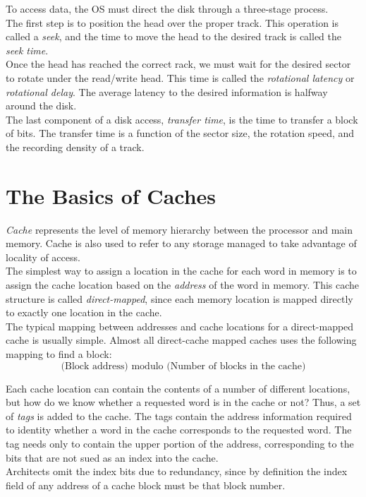 \documentclass[12pt]{article}
\theoremstyle{definition}
\begin{document}
  To access data, the OS must direct the disk through a three-stage process. \\

  The first step is to position the head over the proper track.
  This operation is called a \emph{seek}, and the time to move the head to the desired track is called the \emph{seek time}. \\

  Once the head has reached the correct rack, we must wait for the desired sector to rotate under the read/write head. This time is called the \emph{rotational latency} or \emph{rotational delay}.
  The average latency to the desired information is halfway around the disk. \\

  The last component of a disk access, \emph{transfer time}, is the time to transfer a block of bits.
  The transfer time is a function of the sector size, the rotation speed, and the recording density of a track.

  \section{The Basics of Caches}
  \emph{Cache} represents the level of memory hierarchy between the processor and main memory.
  Cache is also used to refer to any storage managed to take advantage of locality of access. \\

  The simplest way to assign a location in the cache for each word in memory is to assign the cache location based on the \emph{address} of the word in memory.
  This cache structure is called \emph{direct-mapped}, since each memory location is mapped directly to exactly one location in the cache. \\
  The typical mapping between addresses and cache locations for a direct-mapped cache is usually simple.
  Almost all direct-cache mapped caches uses the following mapping to find a block:
  $$\text{(Block address) modulo (Number of blocks in the cache)}$$

  Each cache location can contain the contents of a number of different locations, but how do we know whether a requested word is in the cache or not?
  Thus, a set of \emph{tags} is added to the cache.
  The tags contain the address information required to identity whether a word in the cache corresponds to the requested word.
  The tag needs only to contain the upper portion of the address, corresponding to the bits that are not sued as an index into the cache. \\
  Architects omit the index bits due to redundancy, since by definition the index field of any address of a cache block must be that block number. \\
\end{document}
